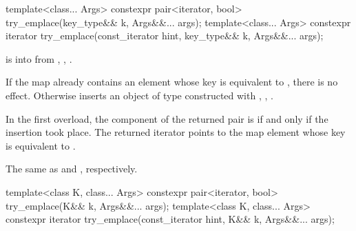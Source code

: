 %
\begin{itemdecl}
template<class... Args>
  constexpr pair<iterator, bool> try_emplace(key_type&& k, Args&&... args);
template<class... Args>
  constexpr iterator try_emplace(const_iterator hint, key_type&& k, Args&&... args);
\end{itemdecl}

\begin{itemdescr}
\pnum
\expects
{} is  into 
from , ,
.

\pnum
\effects
If the map already contains an element
whose key is equivalent to ,
there is no effect.
Otherwise inserts an object of type 
constructed with , ,
.

\pnum
\returns
In the first overload,
the  component of the returned pair is 
if and only if the insertion took place.
The returned iterator points to the map element
whose key is equivalent to .

\pnum
\complexity
The same as  and ,
respectively.
\end{itemdescr}

%
\begin{itemdecl}
template<class K, class... Args>
  constexpr pair<iterator, bool> try_emplace(K&& k, Args&&... args);
template<class K, class... Args>
  constexpr iterator try_emplace(const_iterator hint, K&& k, Args&&... args);
\end{itemdecl}

